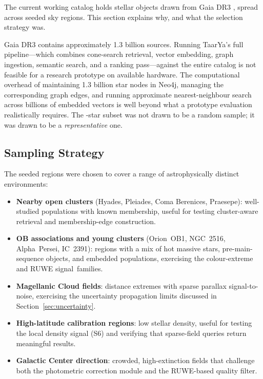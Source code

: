 \documentclass[12pt]{elsarticle}
\begin{document}
The current working catalog holds \nStarsReal{} stellar objects drawn from Gaia DR3 \citep{Vallenari2023}, spread across \nClusterNodes{} seeded sky regions. This section explains why, and what the selection strategy was.

Gaia DR3 contains approximately 1.3 billion sources. Running \textsf{TaarYa}'s full pipeline---which combines cone-search retrieval, vector embedding, graph ingestion, semantic search, and a ranking pass---against the entire catalog is not feasible for a research prototype on available hardware. The computational overhead of maintaining 1.3 billion star nodes in Neo4j, managing the corresponding graph edges, and running approximate nearest-neighbour search across billions of embedded vectors is well beyond what a prototype evaluation realistically requires. The \nStarsReal{}-star subset was not drawn to be a random sample; it was drawn to be a \emph{representative} one.

\subsection{Sampling Strategy}
\label{sec:sampling}

The \nClusterNodes{} seeded regions were chosen to cover a range of astrophysically distinct environments:

\begin{itemize}
    \item \textbf{Nearby open clusters} (Hyades, Pleiades, Coma Berenices, Praesepe): well-studied populations with known membership, useful for testing cluster-aware retrieval and membership-edge construction.
    \item \textbf{OB associations and young clusters} (Orion~OB1, NGC~2516, Alpha~Persei, IC~2391): regions with a mix of hot massive stars, pre-main-sequence objects, and embedded populations, exercising the colour-extreme and RUWE signal~families.
    \item \textbf{Magellanic Cloud fields}: distance extremes with sparse parallax signal-to-noise, exercising the uncertainty propagation limits discussed in Section~\ref{sec:uncertainty}.
    \item \textbf{High-latitude calibration regions}: low stellar density, useful for testing the local density signal (S6) and verifying that sparse-field queries return meaningful results.
    \item \textbf{Galactic Center direction}: crowded, high-extinction fields that challenge both the photometric correction module and the RUWE-based quality filter.
\end{itemize}
\end{document}
